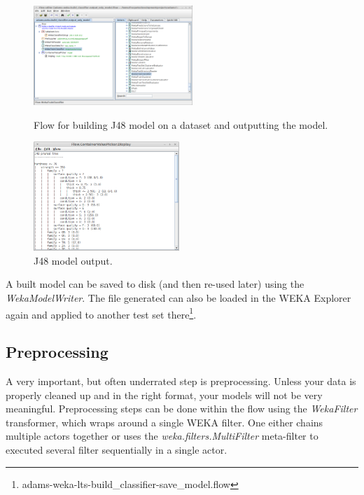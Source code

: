 \begin{figure}[ht]
  \begin{minipage}[t]{0.5\linewidth}
    \centering
    \includegraphics[width=6.0cm]{images/basic-building_model1-flow.png}
    \caption{Flow for building J48 model on a dataset and outputting the model.}
    \label{basic-building_model1-flow}
  \end{minipage}
  \hspace{0.5cm}
  \begin{minipage}[t]{0.5\linewidth}
    \centering
    \includegraphics[width=5.5cm]{images/basic-building_model1-output.png}
    \caption{J48 model output.}
    \label{basic-building_model1-output}
  \end{minipage}
\end{figure}

A built model can be saved to disk (and then re-used later) using the
\textit{WekaModelWriter}. The file generated can also be loaded in the WEKA
Explorer again and applied to another test set
there\footnote{adams-weka-lts-build\_classifier-save\_model.flow}.

\subsection{Preprocessing}
A very important, but often underrated step is preprocessing. Unless your data
is properly cleaned up and in the right format, your models will not be very
meaningful. Preprocessing steps can be done within the flow using the
\textit{WekaFilter} transformer, which wraps around a single WEKA filter. One
either chains multiple actors together or uses the
\textit{weka.filters.MultiFilter} meta-filter to executed several filter
sequentially in a single actor.

